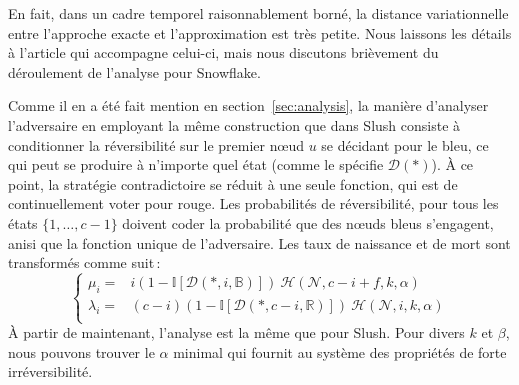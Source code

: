 \documentclass[a4,twocolumn,10pt]{article}
\theoremstyle{definition}
\begin{document}
\begin{appendices}
En fait, dans un cadre temporel raisonnablement borné, la distance variationnelle entre l'approche exacte et l'approximation est très petite.
Nous laissons les détails à l'article qui accompagne celui-ci, mais nous discutons brièvement du déroulement de l'analyse pour Snowflake.


Comme il en a été fait mention en section~\ref{sec:analysis}, la manière d'analyser l'adversaire en employant la même construction que dans Slush consiste à conditionner la réversibilité sur le premier nœud $u$ se décidant pour le bleu, ce qui peut se produire à n'importe quel état (comme le spécifie $\mathcal{D}(*)$). À ce point, la stratégie contradictoire se réduit à une seule fonction, qui est de continuellement voter pour rouge. Les probabilités de réversibilité, pour tous les états $\{1, \dots, c-1\}$ doivent coder la probabilité que des nœuds bleus s'engagent, anisi que la fonction unique de l'adversaire. Les taux de naissance et de mort sont transformés comme suit\,:
\[
    \begin{cases}
        \mu_i = &i(1 - \mathbb{I}[\mathcal{D}(*, i, \mathbb{B})])\ \mathcal{H}(\mathcal{N}, c-i + f, k, \alpha)\\
        \lambda_i = &(c-i)(1 - \mathbb{I}[\mathcal{D}(*, c-i, \mathbb{R})])\ \mathcal{H}(\mathcal{N}, i, k, \alpha)\\
    \end{cases}
\]
À partir de maintenant, l'analyse est la même que pour Slush. Pour divers $k$ et $\beta$, nous pouvons trouver le $\alpha$ minimal qui fournit au système des propriétés de forte irréversibilité.


\end{appendices}
\end{document}
